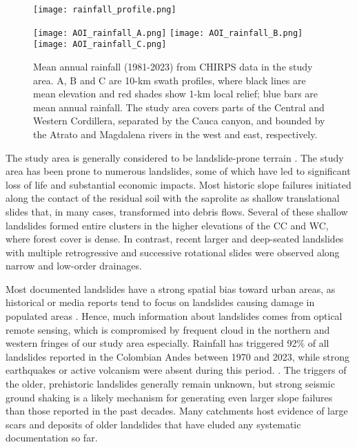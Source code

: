 \documentclass[draft]{agujournal2019}
\begin{document}
\begin{figure}[ht!]
   \begin{minipage}{.48\linewidth}
    \centering
      {\texttt{[image: rainfall\_profile.png]}}
  \end{minipage}
  \begin{minipage}{.48\linewidth}
    \centering
      {\texttt{[image: AOI\_rainfall\_A.png]}}
     {\texttt{[image: AOI\_rainfall\_B.png]}}
     {\texttt{[image: AOI\_rainfall\_C.png]}}
   \end{minipage}\quad
    \caption{Mean annual rainfall (1981-2023) from CHIRPS data \cite{funk2015} in the study area. A, B and C are 10-km swath profiles, where black lines are mean elevation and red shades show 1-km local relief; blue bars are mean annual rainfall. The study area covers parts of the Central and Western Cordillera, separated by the Cauca canyon, and bounded by the Atrato and Magdalena rivers in the west and east, respectively.}
    \label{fig:rainfall}
\end{figure}

\par The study area is generally considered to be landslide-prone terrain \cite{aristizabal2020spatial, gomez2023spatial}. The study area has been prone to numerous landslides, some of which have led to significant loss of life and substantial economic impacts. Most historic slope failures initiated along the contact of the residual soil with the saprolite as shallow translational slides that, in many cases, transformed into debris flows. Several of these shallow landslides formed entire clusters in the higher elevations of the CC and WC, where forest cover is dense. In contrast, recent larger and deep-seated landslides with multiple retrogressive and successive rotational slides were observed along narrow and low-order drainages.

\par Most documented landslides have a strong spatial bias toward urban areas, as historical or media reports tend to focus on landslides causing damage in populated areas \cite{guzzetti2012landslide, froude2018global}. Hence, much information about landslides comes from optical remote sensing, which is compromised by frequent cloud in the northern and western fringes of our study area especially. Rainfall has triggered 92\% of all landslides reported in the Colombian Andes between 1970 and 2023, while strong earthquakes or active volcanism were absent during this period. \cite{aristizabal2020}. The triggers of the older, prehistoric landslides generally remain unknown, but strong seismic ground shaking is a likely mechanism for generating even larger slope failures than those reported in the past decades. Many catchments host evidence of large scars and deposits of older landslides that have eluded any systematic documentation so far.
\end{document}
